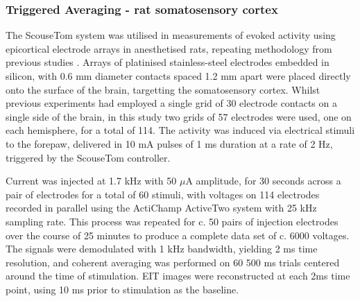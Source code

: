 \subsubsection{Triggered Averaging - rat somatosensory cortex}

The ScouseTom system was utilised in measurements of evoked activity using epicortical electrode arrays in anesthetised rats, repeating methodology from previous studies \cite{Aristovich_2016} \cite{Vongerichten_2016}. Arrays of platinised stainless-steel electrodes embedded in silicon, with 0.6 mm diameter contacts spaced 1.2 mm apart were placed directly onto the surface of the brain, targetting the somatosensory cortex. Whilst previous experiments had employed a single grid of 30 electrode contacts on a single side of the brain, in this study two grids of 57 electrodes were used, one on each hemisphere, for a total of 114. The activity was induced via electrical stimuli to the forepaw, delivered in 10 mA pulses of 1 ms duration at a rate of 2 Hz, triggered by the ScouseTom controller.

Current was injected at 1.7 kHz with 50 $\mu$A amplitude, for 30 seconds across a pair of electrodes for a total of 60 stimuli, with voltages on 114 electrodes recorded in parallel using the ActiChamp ActiveTwo system with 25 kHz sampling rate. This process was repeated for c. 50 pairs of injection electrodes over the course of 25 minutes to produce a complete data set of c. 6000 voltages. The signals were demodulated with 1 kHz bandwidth, yielding 2 ms time resolution, and coherent averaging was performed on 60 500 ms trials centered around the time of stimulation. EIT images were reconstructed at each 2ms time point, using 10 ms prior to stimulation as the baseline. 
